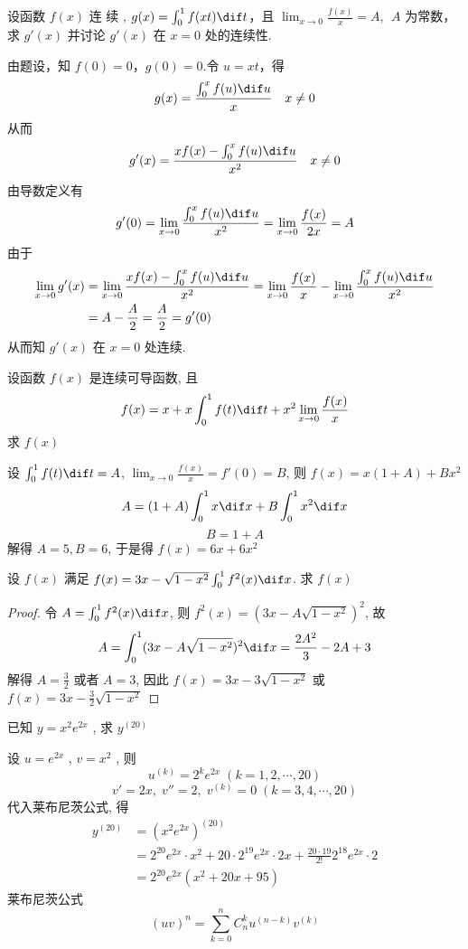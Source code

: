 \documentclass[color=green,titlestyle=hang]{elegantbook}%
\begin{document}
\begin{example}
设函数 $f(x)$ 连 续 , $g(x)=\int_0^1f(xt)\dif t$，且 $\lim_{x\to0}\frac{f(x)}{x}=A$, $\;A$ 为常数，求 $g'(x)$ 并讨论 $g'(x)$ 在 $x=0$ 处的连续性.
\end{example}
\begin{solution}
由题设，知 $f(0)=0$，$g(0)=0$.令 $u=xt$，得\[g(x)=\frac{\int_0^xf(u)\dif u}{x}\quad x\neq0\]
从而\[g'(x)=\frac{xf(x)-\int_0^xf(u)\dif u}{x^2}\quad x\neq0\]
由导数定义有\[g'(0)=\lim\limits_{x\to0}\frac{\int_0^xf(u)\dif u}{x^2}=\lim_{x\to0}\frac{f(x)}{2x}=A\]
由于 \begin{align*}
\lim_{x\to0}g'(x)&=\lim_{x\to0}\frac{xf(x)-\int_0^xf(u)\dif u}{x^2}=\lim_{x\to0}\frac{f(x)}{x}-\lim_{x\to0}\frac{\int_0^xf(u)\dif u}{x^2}\\
&=A-\frac{A}{2}=\frac{A}{2}=g'(0)
\end{align*}
从而知 $g'(x)$ 在 $x=0$ 处连续.	
\end{solution}

\begin{example}
设函数 $f(x)$ 是连续可导函数, 且
\[f(x)=x+x\int_0^1f(t)\dif t+x^2\lim_{x\to0}\frac{f(x)}{x} \]
求 $f(x)$
\end{example}\begin{solution}
设 $\int_0^1f(t)\dif t=A$, $\lim_{x\to0}\frac{f(x)}{x}=f'(0)=B$, 则 $f(x)=x(1+A)+Bx^2$
\[A=(1+A)\int_0^1x\dif x+B\int_0^1x^2\dif x \]
\[B=1+A\]
解得 $A=5,B=6$, 于是得 $f(x)=6x+6x^2$
\end{solution}

\begin{example}
设 $f(x)$ 满足 $f(x)=3x-\sqrt{1-x^2}\int_0^1f^2(x)\dif x$. 求 $f(x)$
\end{example}\begin{proof}
令 $A=\int_0^1f^2(x)\dif x$, 则 $f^2(x)=(3x-A\sqrt{1-x^2})^2$, 故
\[A=\int_0^1(3x-A\sqrt{1-x^2})^2\dif x=\frac{2A^2}{3}-2A+3\]
解得 $A=\frac{3}{2}$ 或者 $A=3$, 因此 $f(x)=3x-3\sqrt{1-x^2}$ 或 $f(x)=3x-\frac{3}{2}\sqrt{1-x^2}$	
\end{proof}

\begin{exercise}  已知 $\displaystyle y=x^2e^{2x}$ , 求 $\displaystyle y^{(20)}$\\[-3mm]
\end{exercise}\begin{Solution}设 $\displaystyle u=e^{2x}$ , $\displaystyle v=x^2$ ,  则
\begin{equation*}u^{(k)}=2^ke^{2x}\;(k=1,2,\cdots,20)\end{equation*}
\begin{equation*}v'=2x,\;v''=2,\;v^{(k)}=0\;(k=3,4,\cdots,20)\end{equation*}
代入莱布尼茨公式, 得\begin{align*}y^{(20)}&=(x^2e^{2x})^{(20)}\\
&=2^{20}e^{2x}\cdot x^2+20\cdot2^{19}e^{2x}\cdot2x+\frac{20\cdot19}{2!}2^{18}e^{2x}\cdot2\\
&=2^{20}e^{2x}(x^2+20x+95)
\end{align*}
莱布尼茨公式\begin{equation*}(uv)^{n}=\sum_{k=0}^{n}C_n^ku^{(n-k)}v^{(k)}\end{equation*}	
\end{Solution}
\end{document}
